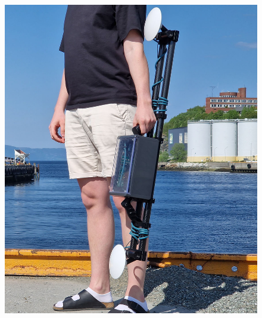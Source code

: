 \begin{figure}[H]
    \centering
    \includegraphics[width=\textwidth]{figures/ergonomics/resting.jpg}
\end{figure}



